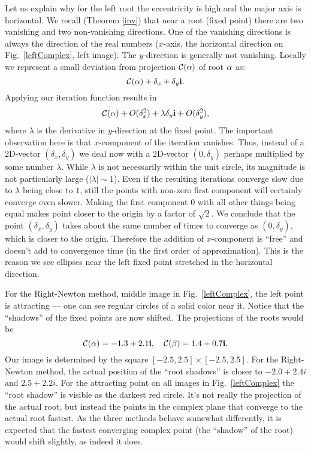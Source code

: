 \documentclass{article}
\theoremstyle{definition}
\begin{document}
Let us explain why for the left root the eccentricity is high and the major axis is horizontal. We recall (Theorem \ref{inv}) that near a root (fixed point) there are two vanishing and two non-vanishing directions. One of the vanishing directions is always the direction of the real numbers ($x$-axis, the horizontal direction on  Fig.~\ref{leftComplex}, left image). The $y$-direction is generally not vanishing. Locally we represent a small deviation from projection ${\cal C} (\alpha)$ of root $\alpha$ as:
\begin{equation}
{\cal C} (\alpha)+\delta_x + \delta_y {\bf i}.
\end{equation}
Applying our iteration function results in
\begin{equation}
{\cal C} (\alpha)+ O(\delta_x^2) + \lambda \delta_y {\bf i} +O(\delta_y^2),
\end{equation}
where $\lambda$ is the derivative in $y$-direction at the fixed point. The important observation here is that $x$-component of the iteration vanishes. Thus, instead of  a 2D-vector $(\delta_x,\delta_y)$ we deal now with a 2D-vector $(0,\delta_y)$ perhaps multiplied by some number $\lambda$. While $\lambda$ is not necessarily within the unit circle, its magnitude is not particularly large ($|\lambda| \sim 1$). Even if the resulting iterations converge slow due to $\lambda$ being close to $1$, still the points with non-zero first component will certainly converge even slower. Making the first component $0$ with all other things being equal makes point closer to the origin by a factor of $\sqrt 2$. We conclude that the point $(\delta_x,\delta_y)$ takes about the same number of times to converge as $(0,\delta_y)$, which is closer to the origin. Therefore the addition of $x$-component is ``free'' and doesn't add to convergence time (in the first order of approximation). This is the reason we see ellipses near the left fixed point stretched in the horizontal direction.

For the Right-Newton method, middle image in Fig.~\ref{leftComplex}, the left point is attracting --- one can see regular circles of a solid color near it. Notice that the ``shadows'' of the fixed points are now shifted. The projections of the roots would be
\begin{equation}
{\cal C}(\alpha)= -1.3+ 2.1 {\bf i} ,\quad {\cal C}(\beta)=
1.4 +0.7 {\bf i}.
\end{equation}
Our image is determined by the square $[-2.5,2.5]\times [-2.5, 2.5]$. For the Right-Newton method, the actual position of the ``root shadows'' is closer to $-2.0 +2.4i$ and $2.5+2.2i$. For the attracting point on all images in Fig.~\ref{leftComplex} the ``root shadow'' is visible as the darkest red circle. It's not really the projection of the actual root, but instead the points in the complex plane that converge to the actual root fastest. As the three methods behave somewhat differently, it is expected that the fastest converging complex point (the ``shadow'' of the root) would shift slightly, as indeed it does.
\end{document}
